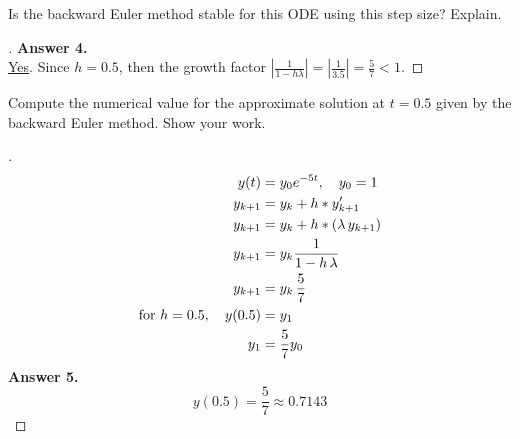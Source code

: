 \documentclass[12pt]{article}
\newenvironment{exercise}[2][Exercise]{\begin{trivlist}
\item[\hskip \labelsep {\bfseries #1}\hskip \labelsep {\bfseries #2.}]}{\end{trivlist}}
\begin{document}
\pagebreak
\begin{exercise}{4}
	Is the backward Euler method stable for this ODE using this step size? Explain.
\end{exercise} 
\begin{proof}[] \vspace{-2mm}
	\textbf{Answer 4.} \\ %
	\underline{Yes}. Since $h=0.5$, then the growth factor $|\frac{1}{1 - h \lambda} | = |\frac{1}{3.5}| = \frac{5}{7} < 1$. 
\end{proof}

\vspace{2mm}
\begin{exercise}{5}
	Compute the numerical value for the approximate solution at $t=0.5$ given by the backward Euler method. Show your work.
\end{exercise} 
\begin{proof}[] \vspace{-2mm}
	\begin{align*}
		y(t) &= y_0 e^{-5t}, \quad y_0 = 1 \\
		y_{k+1} &= y_k + h * y_{k+1}' \\
		y_{k+1} &= y_k + h * (\lambda \, y_{k+1}) \\
		y_{k+1} &= y_k \frac{1}{1 - h \, \lambda}\\
		y_{k+1} &= y_k \, \frac{5}{7}\\
		\textnormal{for } h = 0.5, \quad y(0.5) &= y_1 \\
		y_1 &= \frac{5}{7} y_0
	\end{align*}
	\textbf{Answer 5.}  \vspace{-7mm} \\
	\[ \boxed{ y(0.5) = \frac{5}{7} \approx 0.7143  } \]
\end{proof}
\end{document}
